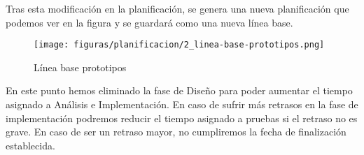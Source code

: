 Tras esta modificación en la planificación, se genera una nueva planificación que podemos ver en la figura y se guardará como una nueva línea base.%

\begin{figure}[H]
    \centerline{\texttt{[image: figuras/planificacion/2\_linea-base-prototipos.png]}}
    \caption{Línea base prototipos}
\end{figure}

En este punto hemos eliminado la fase de Diseño para poder aumentar el tiempo asignado a Análisis e Implementación. En caso de sufrir más retrasos en la fase de implementación podremos reducir el tiempo asignado a pruebas si el retraso no es grave. En caso de ser un retraso mayor, no cumpliremos la fecha de finalización establecida.


